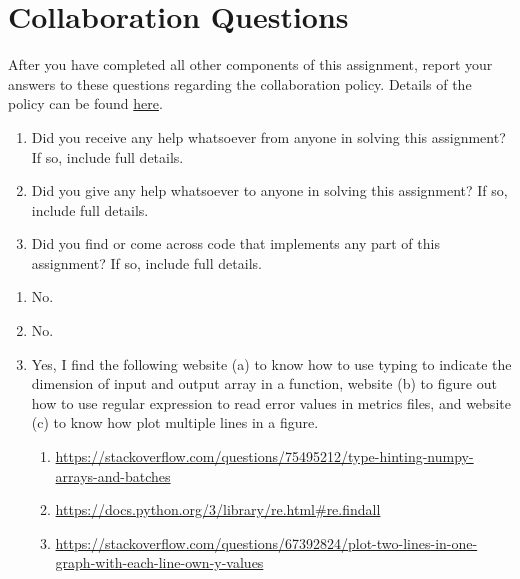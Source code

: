 \documentclass[11pt,addpoints,answers]{exam}
\begin{document}
\begin{questions}
\begin{parts}
    
    

    \clearpage
    
\end{parts}\clearpage
\newpage
\newpage
\section{Collaboration Questions}
After you have completed all other components of this assignment, report your answers to these questions regarding the collaboration policy. Details of the policy can be found \href{http://www.cs.cmu.edu/~mgormley/courses/10601/syllabus.html}{here}.
\begin{enumerate}
    \item Did you receive any help whatsoever from anyone in solving this assignment? If so, include full details.
    \item Did you give any help whatsoever to anyone in solving this assignment? If so, include full details.
    \item Did you find or come across code that implements any part of this assignment? If so, include full details.
\end{enumerate}

\begin{your_solution}[height=6cm]
\begin{enumerate}
	\item No.
	\item No.
	\item Yes, I find the following website (a) to know how to use typing to indicate the dimension of input and output array in a function, website (b) to figure out how to use regular expression to read error values in metrics files, and website (c) to know how plot multiple lines in a figure.
	\small
	\begin{enumerate}
		\item \url{https://stackoverflow.com/questions/75495212/type-hinting-numpy-arrays-and-batches}
		\item \url{https://docs.python.org/3/library/re.html#re.findall}
		\item \url{https://stackoverflow.com/questions/67392824/plot-two-lines-in-one-graph-with-each-line-own-y-values}
	\end{enumerate}
\end{enumerate}
\end{your_solution}
\newpage
\end{questions}
\end{document}

